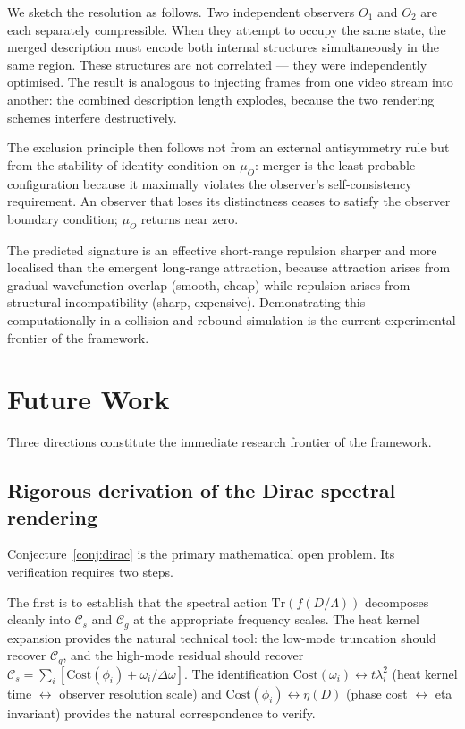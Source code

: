 \documentclass[12pt,a4paper]{article}
\newcommand{\Cs}{\mathcal{C}_s}
\newcommand{\Cg}{\mathcal{C}_g}
\newcommand{\muO}{\mu_O}
\begin{document}
We sketch the resolution as follows. Two independent observers $O_1$ and $O_2$
are each separately compressible. When they attempt to occupy the same state,
the merged description must encode both internal structures simultaneously in
the same region. These structures are not correlated --- they were independently
optimised. The result is analogous to injecting frames from one video stream
into another: the combined description length explodes, because the two
rendering schemes interfere destructively.

The exclusion principle then follows not from an external antisymmetry rule but
from the stability-of-identity condition on $\muO$: merger is the least
probable configuration because it maximally violates the observer's
self-consistency requirement. An observer that loses its distinctness ceases
to satisfy the observer boundary condition; $\muO$ returns near zero.

The predicted signature is an effective short-range repulsion sharper and more
localised than the emergent long-range attraction, because attraction arises
from gradual wavefunction overlap (smooth, cheap) while repulsion arises from
structural incompatibility (sharp, expensive). Demonstrating this
computationally in a collision-and-rebound simulation is the current
experimental frontier of the framework.

\section{Future Work}
\label{sec:future}

Three directions constitute the immediate research frontier of the framework.

\subsection*{Rigorous derivation of the Dirac spectral rendering}

Conjecture~\ref{conj:dirac} is the primary mathematical open problem. Its
verification requires two steps.

The first is to establish that the spectral action
$\mathrm{Tr}(f(D/\Lambda))$ decomposes cleanly into $\Cs$ and $\Cg$ at the
appropriate frequency scales. The heat kernel expansion provides the natural
technical tool: the low-mode truncation should recover $\Cg$, and the
high-mode residual should recover $\Cs = \sum_i [\mathrm{Cost}(\phi_i) +
\omega_i/\Delta\omega]$. The identification
$\mathrm{Cost}(\omega_i) \leftrightarrow t\lambda_i^2$ (heat kernel time
$\leftrightarrow$ observer resolution scale) and
$\mathrm{Cost}(\phi_i) \leftrightarrow \eta(D)$ (phase cost $\leftrightarrow$
eta invariant) provides the natural correspondence to verify.
\end{document}
